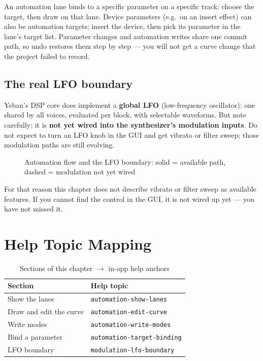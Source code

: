 An automation lane binds to a specific parameter on a specific track: choose the
target, then draw on that lane. Device parameters (e.g.\ on an insert effect) can also
be automation targets; insert the device, then pick its parameter in the lane's target
list. Parameter changes and automation writes share one commit path, so undo restores
them step by step — you will not get a curve change that the project failed to record.

\subsection{The real LFO boundary}

Yeban's DSP core does implement a \textbf{global LFO} (low-frequency oscillator): one
shared by all voices, evaluated per block, with selectable waveforms. But note
carefully: it is \textbf{not yet wired into the synthesizer's modulation inputs}.
Do not expect to turn an LFO knob in the GUI and get vibrato or filter sweep; those
modulation paths are still evolving.

\begin{figure}[htbp]
\centering
{}
\caption{Automation flow and the LFO boundary: solid = available path, dashed = modulation not yet wired}
\label{fig:ch06-automation-flow}
\end{figure}

For that reason this chapter does not describe vibrato or filter sweep as available
features. If you cannot find the control in the GUI, it is not wired up yet — you have
not missed it.

\section{Help Topic Mapping}

\begin{table}[htbp]
\centering
\caption{Sections of this chapter $\to$ in-app help anchors}
\label{tab:ch06-help}
\begin{tabular}{ll}
\hline
Section & Help topic \\
\hline
Show the lanes & \texttt{automation-show-lanes} \\
Draw and edit the curve & \texttt{automation-edit-curve} \\
Write modes & \texttt{automation-write-modes} \\
Bind a parameter & \texttt{automation-target-binding} \\
LFO boundary & \texttt{modulation-lfo-boundary} \\
\hline
\end{tabular}
\end{table}

